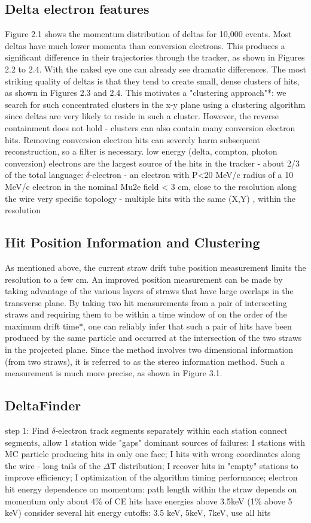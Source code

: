 \subsection{Delta electron features}
Figure 2.1 shows the momentum distribution of deltas for 10,000 events.
Most deltas have much lower momenta than conversion electrons. This produces a significant
difference in their trajectories through the tracker, as shown in Figures 2.2 to 2.4. With the naked eye
one can already see dramatic differences.
The most striking quality of deltas is that they tend to create small, dense clusters of hits, as
shown in Figures 2.3 and 2.4. This motivates a "clustering approach"*: we search for such
concentrated clusters in the x-y plane using a clustering algorithm since deltas are very likely to reside
in such a cluster. However, the reverse containment does not hold - clusters can also contain many
conversion electron hits. Removing conversion electron hits can severely harm subsequent
reconstruction, so a filter is necessary. 
low energy (delta, compton, photon conversion) electrons are the largest source of the hits
in the tracker - about 2/3 of the total
language: $\delta$-electron - an electron with P<20 MeV/c
radius of a 10 MeV/c electron in the nominal Mu2e field < 3 cm, close to the resolution
along the wire
very specific topology - multiple hits with the same (X,Y) , within the resolution
\subsection{Hit Position Information and Clustering}
As mentioned above, the current straw drift tube position measurement limits the resolution to a
few cm. An improved position measurement can be made by taking advantage of the various layers of
straws that have large overlaps in the transverse plane. By taking two hit measurements from a pair of
intersecting straws and requiring them to be within a time window of on the order of the maximum
drift time*, one can reliably infer that such a pair of hits have been produced by the same particle and
occurred at the intersection of the two straws in the projected plane. Since the method involves two
dimensional information (from two straws), it is referred to as the stereo information method. Such a
measurement is much more precise, as shown in Figure 3.1.

\subsection{DeltaFinder}
step 1: Find $\delta$-electron track segments separately within each station
connect segments, allow 1 station wide "gaps"
dominant sources of failures:
I stations with MC particle producing hits in only one face;
I hits with wrong coordinates along the wire - long tails of the $\Delta$T distribution;
I recover hits in "empty" stations to improve efficiency;
I optimization of the algorithm timing performance;
electron hit energy dependence on momentum: path length within the straw depends on momentum
only about 4\% of CE hits have energies above 3.5keV (1\% above 5 keV)
consider several hit energy cutoffs: 3.5 keV, 5keV, 7keV, use all hits
